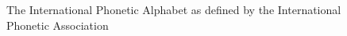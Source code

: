 \documentclass[titlepage]{article}
\begin{document}
  \begin{figure}
    \caption{The International Phonetic Alphabet as defined by the International
    Phonetic Association}
    \label{ipaChart}
  \end{figure}

\newpage
\printbibliography
\end{document}
